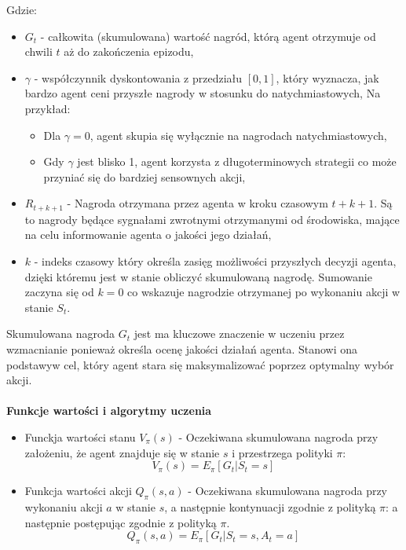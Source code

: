 \documentclass[a4paper, 12pt]{article}
\begin{document}
    Gdzie:
    \begin{itemize}
        \item \( G_t \) - całkowita (skumulowana) wartość nagród, którą agent otrzymuje od chwili \( t \) aż do zakończenia epizodu,
        \item \( \gamma \) - współczynnik dyskontowania z przedziału \( [0,1] \), który wyznacza, jak bardzo agent ceni przyszłe nagrody w stosunku do natychmiastowych,
        Na przykład:
        \begin{itemize}
            \item Dla \( \gamma = 0 \), agent skupia się wyłącznie na nagrodach natychmiastowych,
            \item Gdy \( \gamma \) jest blisko 1, agent korzysta z długoterminowych strategii co może przyniać się do bardziej sensownych akcji,
        \end{itemize}
        \item \( R_{t+k+1} \) - Nagroda otrzymana przez agenta w kroku czasowym \( t + k + 1 \). Są to nagrody będące sygnałami zwrotnymi otrzymanymi
        od środowiska, mające na celu informowanie agenta o jakości jego działań,
        \item \( k \) - indeks czasowy który określa zasięg możliwości przyszłych decyzji agenta, dzięki któremu jest w stanie obliczyć skumulowaną nagrodę.
        Sumowanie zaczyna się od \( k = 0 \) co wskazuje nagrodzie otrzymanej po wykonaniu akcji w stanie \( S_t \).
    \end{itemize}
    Skumulowana nagroda \( G_t \) jest ma kluczowe znaczenie w uczeniu przez wzmacnianie ponieważ określa ocenę jakości działań agenta. Stanowi ona podstawyw cel, który agent stara się 
    maksymalizować poprzez optymalny wybór akcji.
    \\ \\ 
    \textbf{Funkcje wartości i algorytmy uczenia}
    \begin{itemize}
        \item Funckja wartości stanu \( V_\pi(s) \) - Oczekiwana skumulowana nagroda przy założeniu, że agent znajduje się w stanie \( s \) i przestrzega polityki \( \pi \):
        \[ V_\pi(s) = E_\pi[G_t|S_t=s] \]
        \item Funkcja wartości akcji \( Q_\pi(s,a) \) - Oczekiwana skumulowana nagroda przy wykonaniu akcji \( a \) w stanie \( s \), a następnie kontynuacji zgodnie z polityką \( \pi \):
        a następnie postępując zgodnie z polityką \( \pi \).
        \[ Q_\pi(s,a) = E_\pi[G_t|S_t=s,A_t=a] \]
    \end{itemize}
\end{document}
